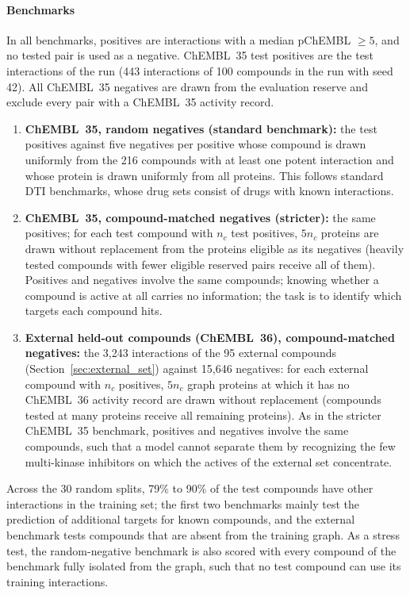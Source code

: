 \documentclass[11pt,letterpaper]{article}
\begin{document}
\paragraph{Benchmarks}
In all benchmarks, positives are interactions with a median pChEMBL $\geq 5$, and no tested pair is used as a negative. ChEMBL~35 test positives are the test interactions of the run (443 interactions of 100 compounds in the run with seed 42). All ChEMBL~35 negatives are drawn from the evaluation reserve and exclude every pair with a ChEMBL~35 activity record.
\begin{enumerate}
    \item \textbf{ChEMBL~35, random negatives (standard benchmark):} the test positives against five negatives per positive whose compound is drawn uniformly from the 216 compounds with at least one potent interaction and whose protein is drawn uniformly from all proteins. This follows standard DTI benchmarks, whose drug sets consist of drugs with known interactions.
    \item \textbf{ChEMBL~35, compound-matched negatives (stricter):} the same positives; for each test compound with $n_c$ test positives, $5n_c$ proteins are drawn without replacement from the proteins eligible as its negatives (heavily tested compounds with fewer eligible reserved pairs receive all of them). Positives and negatives involve the same compounds; knowing whether a compound is active at all carries no information; the task is to identify which targets each compound hits.
    \item \textbf{External held-out compounds (ChEMBL~36), compound-matched negatives:} the 3,243 interactions of the 95 external compounds (Section~\ref{sec:external_set}) against 15,646 negatives: for each external compound with $n_c$ positives, $5n_c$ graph proteins at which it has no ChEMBL~36 activity record are drawn without replacement (compounds tested at many proteins receive all remaining proteins). As in the stricter ChEMBL~35 benchmark, positives and negatives involve the same compounds, such that a model cannot separate them by recognizing the few multi-kinase inhibitors on which the actives of the external set concentrate.
\end{enumerate}
Across the 30 random splits, 79\% to 90\% of the test compounds have other interactions in the training set; the first two benchmarks mainly test the prediction of additional targets for known compounds, and the external benchmark tests compounds that are absent from the training graph. As a stress test, the random-negative benchmark is also scored with every compound of the benchmark fully isolated from the graph, such that no test compound can use its training interactions.
\end{document}
